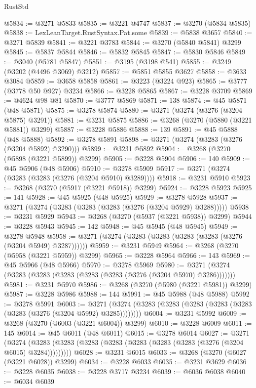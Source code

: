 \begin{lexlean}{RustStd}
\begin{coremodule}
{\begin{coremodule}
{{{{{{{{{{{{{{{{{{{{{{{{{{{{{{{{{{{{{@5834 := @3271 @5833
@5835 := @3221 @4747
@5837 := @3270 (@5834 @5835)
@5838 := LexLeanTarget.RustSyntax.Pat.some
@5839 := @5838 @3657
@5840 := @3271 @5839
@5841 := @3221 @3783
@5844 := @3270 (@5840 @5841) @3299
@5845 := @5837 @5844
@5846 := @5832 @5845
@5847 := @5830 @5846
@5849 := @3040 (@5781 @5847)
@5851 := @3195 (@3198 @541)
@5855 := @3249 (@3202 (@4496 @3069) @3212)
@5857 := @5851 @5855 @3627
@5858 := @3633 @3084
@5859 := @3658 @5858
@5861 := @3223 (@3224 @923)
@5865 := @3777 (@3778 @50 @927) @3234
@5866 := @3228 @5865
@5867 := @3228 @3709
@5869 := @4624 @98 @81
@5870 := @3777 @5869
@5871 := 138
@5874 := @45 @5871 (@48 @5871)
@5875 := @3278 @5874
@5880 := @3271 (@3274 (@3276 (@3204 @5875) @3291))
@5881 := @3231 @5875
@5886 := @3268 (@3270 (@5880 (@3221 @5881)) @3299)
@5887 := @3228 @5886
@5888 := 139
@5891 := @45 @5888 (@48 @5888)
@5892 := @3278 @5891
@5898 := @3271 (@3274 (@3283 (@3276 (@3204 @5892) @3290)))
@5899 := @3231 @5892
@5904 := @3268 (@3270 (@5898 (@3221 @5899)) @3299)
@5905 := @3228 @5904
@5906 := 140
@5909 := @45 @5906 (@48 @5906)
@5910 := @3278 @5909
@5917 := @3271 (@3274 (@3283 (@3283 (@3276 (@3204 @5910) @3289))))
@5918 := @3231 @5910
@5923 := @3268 (@3270 (@5917 (@3221 @5918)) @3299)
@5924 := @3228 @5923
@5925 := 141
@5928 := @45 @5925 (@48 @5925)
@5929 := @3278 @5928
@5937 := @3271 (@3274 (@3283 (@3283 (@3283 (@3276 (@3204 @5929) @3288)))))
@5938 := @3231 @5929
@5943 := @3268 (@3270 (@5937 (@3221 @5938)) @3299)
@5944 := @3228 @5943
@5945 := 142
@5948 := @45 @5945 (@48 @5945)
@5949 := @3278 @5948
@5958 := @3271 (@3274 (@3283 (@3283 (@3283 (@3283 (@3276 (@3204 @5949) @3287))))))
@5959 := @3231 @5949
@5964 := @3268 (@3270 (@5958 (@3221 @5959)) @3299)
@5965 := @3228 @5964
@5966 := 143
@5969 := @45 @5966 (@48 @5966)
@5970 := @3278 @5969
@5980 := @3271 (@3274 (@3283 (@3283 (@3283 (@3283 (@3283 (@3276 (@3204 @5970) @3286)))))))
@5981 := @3231 @5970
@5986 := @3268 (@3270 (@5980 (@3221 @5981)) @3299)
@5987 := @3228 @5986
@5988 := 144
@5991 := @45 @5988 (@48 @5988)
@5992 := @3278 @5991
@6003 := @3271 (@3274 (@3283 (@3283 (@3283 (@3283 (@3283 (@3283 (@3276 (@3204 @5992) @3285))))))))
@6004 := @3231 @5992
@6009 := @3268 (@3270 (@6003 (@3221 @6004)) @3299)
@6010 := @3228 @6009
@6011 := 145
@6014 := @45 @6011 (@48 @6011)
@6015 := @3278 @6014
@6027 := @3271
    (@3274 (@3283 (@3283 (@3283 (@3283 (@3283 (@3283 (@3283 (@3276 (@3204 @6015) @3284)))))))))
@6028 := @3231 @6015
@6033 := @3268 (@3270 (@6027 (@3221 @6028)) @3299)
@6034 := @3228 @6033
@6035 := @3231 @3629
@6036 := @3228 @6035
@6038 := @3228 @3717 @3234
@6039 := @6036 @6038
@6040 := @6034 @6039
}}}}}}}}}}}}}}}}}}}}}}}}}}}}}}}}}}}}}
\end{coremodule}}
\end{coremodule}
\end{lexlean}
